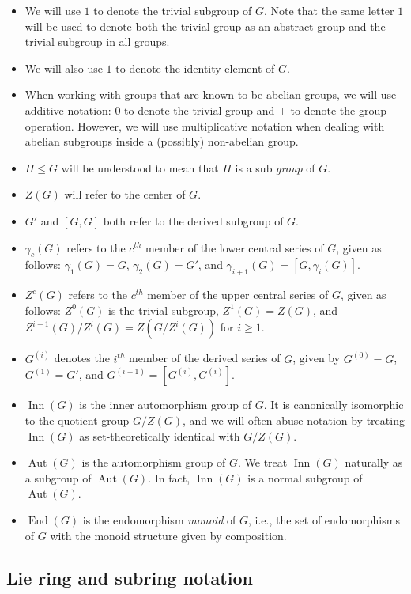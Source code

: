 \documentclass{ucetd}
\begin{document}
\begin{itemize}
\item We will use $1$ to denote the trivial subgroup of $G$. Note that
  the same letter $1$ will be used to denote both the trivial group as
  an abstract group and the trivial subgroup in all groups.
\item We will also use $1$ to denote the identity element of $G$.
\item When working with groups that are known to be abelian groups, we
  will use additive notation: $0$ to denote the trivial group and $+$
  to denote the group operation. However, we will use multiplicative
  notation when dealing with abelian subgroups inside a (possibly)
  non-abelian group.
\item $H \le G$ will be understood to mean that $H$ is a sub{\em
  group} of $G$.
\item $Z(G)$ will refer to the center of $G$.
\item $G'$ and $[G,G]$ both refer to the derived subgroup of $G$.
\item $\gamma_c(G)$ refers to the $c^{th}$ member of the lower central
  series of $G$, given as follows: $\gamma_1(G) = G$, $\gamma_2(G) = G'$,
  and $\gamma_{i+1}(G) = [G,\gamma_i(G)]$.
\item $Z^c(G)$ refers to the $c^{th}$ member of the upper central
  series of $G$, given as follows: $Z^0(G)$ is the trivial subgroup,
  $Z^1(G) = Z(G)$, and $Z^{i+1}(G)/Z^i(G) = Z(G/Z^i(G))$ for
  $i \ge 1$.
\item $G^{(i)}$ denotes the $i^{th}$ member of the derived series of
  $G$, given by $G^{(0)} = G$, $G^{(1)} = G'$, and $G^{(i+1)} =
  [G^{(i)},G^{(i)}]$.
\item $\operatorname{Inn}(G)$ is the inner automorphism group of
  $G$. It is canonically isomorphic to the quotient group $G/Z(G)$,
  and we will often abuse notation by treating $\operatorname{Inn}(G)$
  as set-theoretically identical with $G/Z(G)$.
\item $\operatorname{Aut}(G)$ is the automorphism group of $G$. We
  treat $\operatorname{Inn}(G)$ naturally as a subgroup of
  $\operatorname{Aut}(G)$. In fact, $\operatorname{Inn}(G)$ is a
  normal subgroup of $\operatorname{Aut}(G)$.
\item $\operatorname{End}(G)$ is the endomorphism {\em monoid} of $G$,
  i.e., the set of endomorphisms of $G$ with the monoid structure
  given by composition.
\end{itemize}

\subsection{Lie ring and subring notation}\label{sec:lie-ring-notation}
\end{document}
